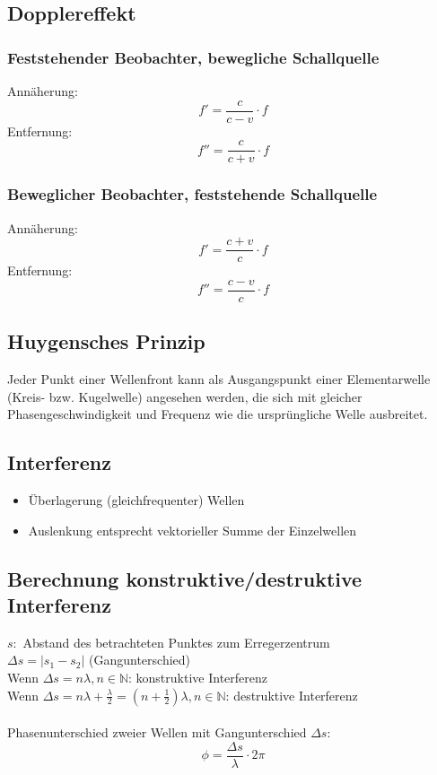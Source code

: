 \documentclass[12pt,a4paper,titlepage]{article}
\begin{document}
		\subsection{Dopplereffekt}
			\subsubsection{Feststehender Beobachter, bewegliche Schallquelle}
				Annäherung: 
				$$f' = \frac{c}{c-v}\cdot f$$
				Entfernung: 
				$$f'' = \frac{c}{c+v}\cdot f$$
			\subsubsection{Beweglicher Beobachter, feststehende Schallquelle}
				Annäherung: 
				$$f' = \frac{c+v}{c}\cdot f$$
				Entfernung: 
				$$f'' = \frac{c-v}{c}\cdot f$$
		\subsection{Huygensches Prinzip}
			Jeder Punkt einer Wellenfront kann als Ausgangspunkt einer Elementarwelle (Kreis- bzw. Kugelwelle) angesehen werden, die sich mit gleicher Phasengeschwindigkeit und Frequenz wie die ursprüngliche Welle ausbreitet.
		\subsection{Interferenz}
			\begin{itemize}
				\item Überlagerung (gleichfrequenter) Wellen
				\item Auslenkung entsprecht vektorieller Summe der Einzelwellen
			\end{itemize}
			\subsection{Berechnung konstruktive/destruktive Interferenz}
			$s:$ Abstand des betrachteten Punktes zum Erregerzentrum \\
			$\Delta s = |s_1 - s_2|$ (Gangunterschied)\\
			Wenn $\Delta s = n \lambda, n \in \mathbb{N}$: konstruktive Interferenz\\
			Wenn $\Delta s = n \lambda + \frac{\lambda}{2} = (n+\frac{1}{2}) \lambda, n \in \mathbb{N}$: destruktive Interferenz\\\\
			Phasenunterschied zweier Wellen mit Gangunterschied $\Delta s$:\\
			$$\phi = \frac{\Delta s}{\lambda} \cdot 2 \pi$$
	\pagebreak
\end{document}
